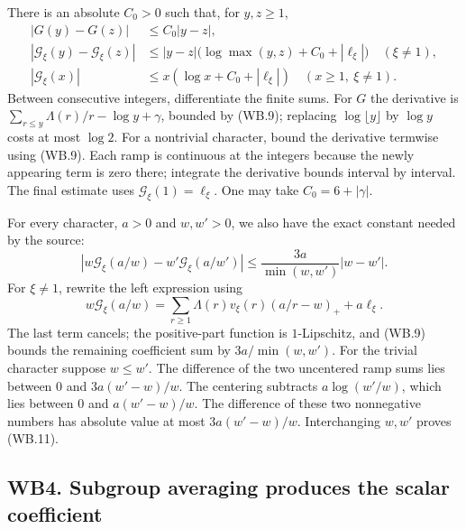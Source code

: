 There is an absolute $C_0>0$ such that, for $y,z\ge1$,
\begin{align*}
 |G(y)-G(z)|&\le C_0|y-z|,\\
 |\mathcal G_\xi(y)-\mathcal G_\xi(z)|
 &\le |y-z|\bigl(\log\max(y,z)+C_0+|\ell_\xi|\bigr)
                 \quad(\xi\ne1),\\
 |\mathcal G_\xi(x)|&\le x(\log x+C_0+|\ell_\xi|)
                 \quad(x\ge1,\ \xi\ne1).
 \tag{WB.10}
\end{align*}
Between consecutive integers, differentiate the finite sums. For $G$
the derivative is $\sum_{r\le y}\Lambda(r)/r-\log y+\gamma$,
bounded by (WB.9); replacing $\log\lfloor y\rfloor$ by $\log y$
costs at most $\log2$. For a nontrivial character, bound the
derivative termwise using (WB.9). Each ramp is continuous at the
integers because the newly appearing term is zero there; integrate
the derivative bounds interval by interval. The final estimate uses
$\mathcal G_\xi(1)=\ell_\xi$. One may take $C_0=6+|\gamma|$.

For every character, $a>0$ and $w,w'>0$, we also have the exact
constant needed by the source:
\[
 \left|w\mathcal G_\xi(a/w)-w'\mathcal G_\xi(a/w')\right|
 \le\frac{3a}{\min(w,w')}|w-w'|.
 \tag{WB.11}
\]
For $\xi\ne1$, rewrite the left expression using
\[
 w\mathcal G_\xi(a/w)
 =\sum_{r\ge1}\Lambda(r)v_\xi(r)(a/r-w)_++a\ell_\xi.
\]
The last term cancels; the positive-part function is $1$-Lipschitz,
and (WB.9) bounds the remaining coefficient sum by
$3a/\min(w,w')$. For the trivial character suppose $w\le w'$.
The difference of the two uncentered ramp sums lies between $0$ and
$3a(w'-w)/w$. The centering subtracts
$a\log(w'/w)$, which lies between $0$ and $a(w'-w)/w$.
The difference of these two nonnegative numbers has absolute value
at most $3a(w'-w)/w$. Interchanging $w,w'$ proves (WB.11).

\subsection{WB4. Subgroup averaging produces the scalar coefficient}


